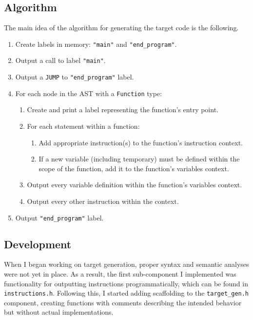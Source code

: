 \documentclass[a4paper, 11pt]{article}
\begin{document}
        \subsection*{Algorithm}
        
        The main idea of the algorithm for generating the target code is the following.
        \begin{enumerate}
            \item Create labels in memory: \texttt{"main"} and \texttt{"end\_program"}.
            \item Output a call to label \texttt{"main"}.
            \item Output a \texttt{JUMP} to \texttt{"end\_program"} label.
            \item For each node in the AST with a \texttt{Function} type:
            \begin{enumerate}
                \item Create and print a label representing the function's entry point.
                \item For each statement within a function:
                \begin{enumerate}
                    \item Add appropriate instruction(s) to the function's instruction context.
                    \item If a new variable (including temporary) must be defined within the scope of the function, add it to the function's variables context.
                \end{enumerate}
                \item Output every variable definition within the function's variables context.
                \item Output every other instruction within the context.
            \end{enumerate}
            \item Output \texttt{"end\_program"} label.
        \end{enumerate}

        \subsection*{Development}

        When I began working on target generation, proper syntax and semantic analyses were not yet in place. As a result, the first sub-component I implemented was functionality for outputting instructions programmatically, which can be found in \texttt{instructions.h}. Following this, I started adding scaffolding to the \texttt{target\_gen.h} component, creating functions with comments describing the intended behavior but without actual implementations.
        
\end{document}
